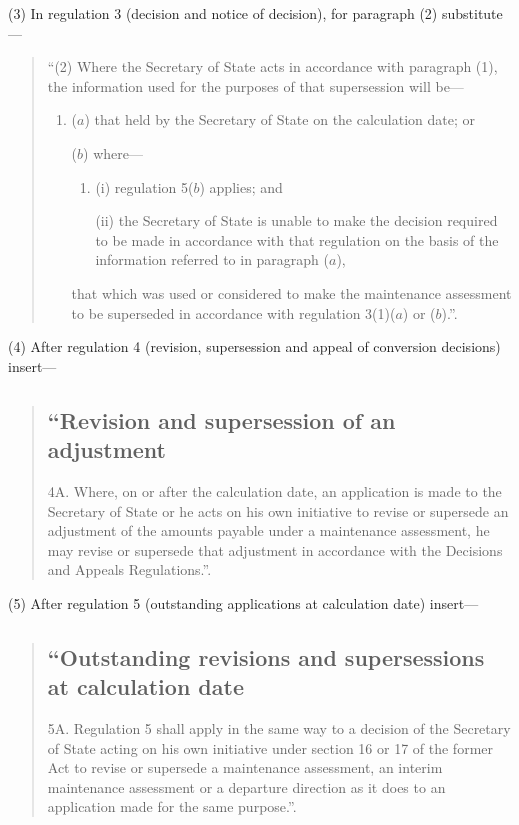 \documentclass[12pt,a4paper]{article}
\begin{document}
(3) In regulation 3 (decision and notice of decision), for paragraph (2) substitute—
\begin{quotation}
“(2) Where the Secretary of State acts in accordance with paragraph (1), the information used for the purposes of that supersession will be—
\begin{enumerate}\item[]
($a$) that held by the Secretary of State on the calculation date; or

($b$) where—
\begin{enumerate}\item[]
(i) regulation 5($b$)  applies; and

(ii) the Secretary of State is unable to make the decision required to be made in accordance with that regulation on the basis of the information referred to in paragraph ($a$),
\end{enumerate}
that which was used or considered to make the maintenance assessment to be superseded in accordance with regulation 3(1)($a$)  or ($b$).”.
\end{enumerate}
\end{quotation}

(4) After regulation 4 (revision, supersession and appeal of conversion decisions) insert—
\begin{quotation}
\subsection*{“Revision and supersession of an adjustment}

4A.  Where, on or after the calculation date, an application is made to the Secretary of State or he acts on his own initiative to revise or supersede an adjustment of the amounts payable under a maintenance assessment, he may revise or supersede that adjustment in accordance with the Decisions and Appeals Regulations.”.
\end{quotation}

(5) After regulation 5 (outstanding applications at calculation date) insert—
\begin{quotation}
\subsection*{“Outstanding revisions and supersessions at calculation date}

5A.  Regulation 5 shall apply in the same way to a decision of the Secretary of State acting on his own initiative under section 16 or 17 of the former Act to revise or supersede a maintenance assessment, an interim maintenance assessment or a departure direction as it does to an application made for the same purpose.”.
\end{quotation}
\end{document}
